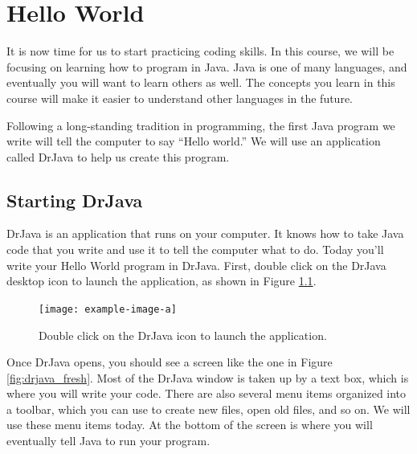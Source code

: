 \chapter{Hello World}

It is now time for us to start practicing coding skills. In this course, we will be focusing on learning how to program in Java. Java is one of many languages, and eventually you will want to learn others as well. The concepts you learn in this course will make it easier to understand other languages in the future.

Following a long-standing tradition in programming, the first Java program we write will tell the computer to say ``Hello world.'' We will use an application called DrJava to help us create this program.

\section{Starting DrJava}

DrJava is an application that runs on your computer. It knows how to take Java code that you write and use it to tell the computer what to do. Today you'll write your Hello World program in DrJava. First, double click on the DrJava desktop icon to launch the application, as shown in Figure \ref{fig:drjava_launch}.

\begin{figure}
    \centering
    \texttt{[image: example-image-a]}
    \caption{Double click on the DrJava icon to launch the application.}
    \label{fig:drjava_launch}
\end{figure}

Once DrJava opens, you should see a screen like the one in Figure \ref{fig:drjava_fresh}. Most of the DrJava window is taken up by a text box, which is where you will write your code. There are also several menu items organized into a toolbar, which you can use to create new files, open old files, and so on. We will use these menu items today. At the bottom of the screen is where you will eventually tell Java to run your program.

